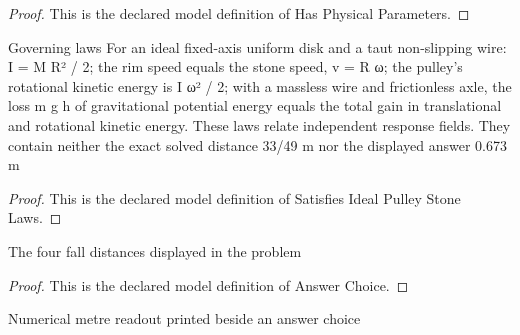 \begin{proof}
  This is the declared model definition of Has Physical Parameters.
\end{proof}
\begin{definition}
  \label{def:physics:phyx-mini-0770:phyxminiproblems-problemphyxmini0770-satisfiesidealpulleystonelaws}
  Governing laws For an ideal fixed-axis uniform disk and a taut non-slipping wire: I = M R² / 2; the rim speed equals the stone speed, v = R ω; the pulley's rotational kinetic energy is I ω² / 2; with a massless wire and frictionless axle, the loss m g h of gravitational potential energy equals the total gain in translational and rotational kinetic energy. These laws relate independent response fields. They contain neither the exact solved distance 33/49 m nor the displayed answer 0.673 m
\end{definition}
\begin{proof}
  This is the declared model definition of Satisfies Ideal Pulley Stone Laws.
\end{proof}
\begin{definition}
  \label{def:physics:phyx-mini-0770:phyxminiproblems-problemphyxmini0770-answerchoice}
  The four fall distances displayed in the problem
\end{definition}
\begin{proof}
  This is the declared model definition of Answer Choice.
\end{proof}
\begin{definition}
  \label{def:physics:phyx-mini-0770:phyxminiproblems-problemphyxmini0770-displayedfalldistancemeters}
  Numerical metre readout printed beside an answer choice
\end{definition}
